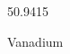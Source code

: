 \documentclass[12pt]{article}
\begin{document}
\hfill{}
\vfill
\begin{center}
  {\fontsize{50}{60}
  }

  50.9415

Vanadium
\end{center}
\vfill
\end{document}
